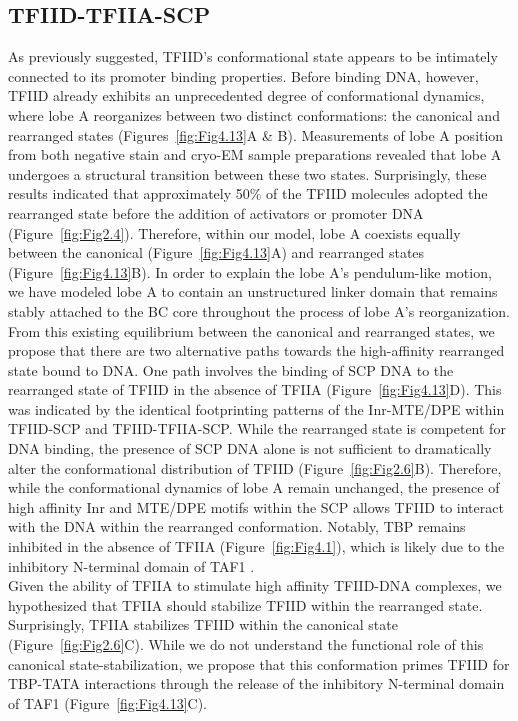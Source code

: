 \subsection{TFIID-TFIIA-SCP}

As previously suggested, TFIID's conformational state appears to be intimately connected to its promoter binding properties. Before binding DNA, however, TFIID already exhibits an unprecedented degree of conformational dynamics, where lobe A reorganizes between two distinct conformations: the canonical and rearranged states (Figures~\ref{fig:Fig4.13}A \& B). Measurements of lobe A position from both negative stain and cryo-EM sample preparations revealed that lobe A undergoes a structural transition between these two states. Surprisingly, these results indicated that approximately 50\% of the TFIID molecules adopted the rearranged state before the addition of activators or promoter DNA  (Figure~\ref{fig:Fig2.4}). Therefore, within our model, lobe A coexists equally between the canonical (Figure~\ref{fig:Fig4.13}A) and rearranged states (Figure~\ref{fig:Fig4.13}B). In order to explain the lobe A's pendulum-like motion, we have modeled lobe A to contain an unstructured linker domain that remains stably attached to the BC core throughout the process of lobe A's reorganization. \\
\indent From this existing equilibrium between the canonical and rearranged states, we propose that there are two alternative paths towards the high-affinity rearranged state bound to DNA. One path involves the binding of SCP DNA to the rearranged state of TFIID in the absence of TFIIA (Figure~\ref{fig:Fig4.13}D). This was indicated by the identical footprinting patterns of the Inr-MTE/DPE within TFIID-SCP and TFIID-TFIIA-SCP. While the rearranged state is competent for DNA binding, the presence of SCP DNA alone is not sufficient to dramatically alter the conformational distribution of TFIID (Figure~\ref{fig:Fig2.6}B). Therefore, while the conformational dynamics of lobe A remain unchanged, the presence of high affinity Inr and MTE/DPE motifs within the SCP allows TFIID to interact with the DNA within the rearranged conformation.  Notably, TBP remains inhibited in the absence of TFIIA (Figure~\ref{fig:Fig4.1}), which is likely due to the inhibitory N-terminal domain of TAF1 \cite{Bagby_2202,Geiger_2949,Liu_2574}. \\
\indent Given the ability of TFIIA to stimulate high affinity TFIID-DNA complexes, we hypothesized that TFIIA should stabilize TFIID within the rearranged state. Surprisingly, TFIIA stabilizes TFIID within the canonical state (Figure~\ref{fig:Fig2.6}C). While we do not understand the functional role of this canonical state-stabilization, we propose that this conformation primes TFIID for TBP-TATA interactions through the release of the inhibitory N-terminal domain of TAF1 (Figure~\ref{fig:Fig4.13}C). \\
